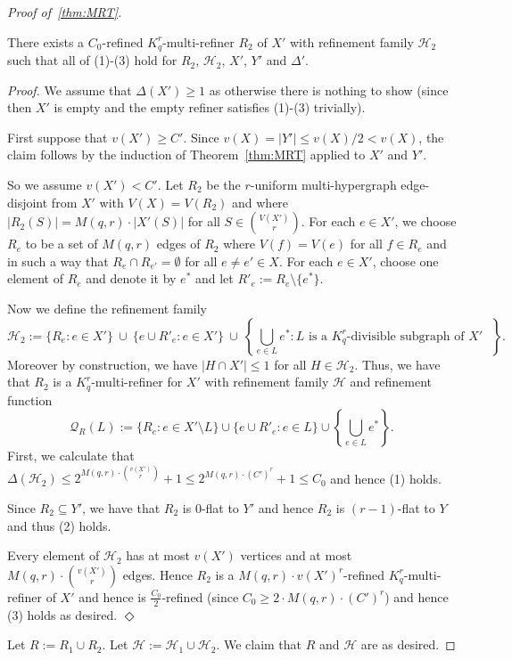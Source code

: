 \documentclass[11pt]{article}
\newcounter{i}
\theoremstyle{plain}
\newenvironment{proofclaim}[1][]%
{\noindent \emph{Proof.} {}{#1}{}}{\hfill
	$\Diamond$\vspace{1em}}
\renewcommand{\theclaim}{\thetheorem.\arabic{claim}}
\newenvironment{lateproof}[1]
 {%
  \renewcommand{\theclaim}{\ref{#1}.\arabic{claim}}%
  \begin{proof}[Proof of~\cref{#1}]%
 }
 {\end{proof}}
\theoremstyle{plain} %
\theoremstyle{definition}
\begin{document}
\begin{lateproof}{thm:MRT}
\begin{claim}
There exists a $C_0$-refined $K_q^r$-multi-refiner $R_2$ of $X'$ with refinement family $\mathcal{H}_2$ such that all of (1)-(3) hold for $R_2$, $\mathcal{H}_2$, $X'$, $Y'$ and $\Delta'$.
\end{claim}
\begin{proofclaim}
We assume that $\Delta(X') \ge 1$ as otherwise there is nothing to show (since then $X'$ is empty and the empty refiner satisfies (1)-(3) trivially). 

First suppose that $v(X')\ge C'$. Since $v(X)=|Y'| \le v(X)/2 < v(X)$, the claim follows by the induction of Theorem~\ref{thm:MRT} applied to $X'$ and $Y'$.

So we assume $v(X') < C'$. Let $R_2$ be the $r$-uniform multi-hypergraph edge-disjoint from $X'$ with $V(X)=V(R_2)$ and where $|R_2(S)|= M(q,r)\cdot |X'(S)|$ for all $S\in \binom{V(X')}{r}$. For each $e\in X'$, we choose $R_e$ to be a set of $M(q,r)$ edges of $R_2$ where $V(f)=V(e)$ for all $f\in R_e$ and in such a way that $R_e\cap R_{e'}=\emptyset$ for all $e\ne e'\in X$. For each $e\in X'$, choose one element of $R_e$ and denote it by $e^*$ and let $R'_e := R_e\setminus \{e^*\}$.

Now we define the refinement family 
$$\mathcal{H}_2 := \{R_e:e\in X'\}~\cup~\{e\cup R'_e: e\in X'\}~\cup~\left\{ \bigcup_{e\in L} e^*: L \text{ is a $K_q^r$-divisible subgraph of $X'$ }\right\}.$$
Moreover by construction, we have $|H\cap X'|\le 1$ for all $H\in \mathcal{H}_2$. Thus, we have that $R_2$ is a $K_q^r$-multi-refiner for $X'$ with refinement family $\mathcal{H}$ and refinement function
$$\mathcal{Q}_R(L) := \{R_e: e\in X'\setminus L\} \cup \{e\cup R'_e: e\in L\} \cup \left\{\bigcup_{e\in L} e^*\right\}.$$
First, we calculate that $\Delta(\mathcal{H}_2)\le 2^{M(q,r)\cdot \binom{v(X')}{r}} + 1 \le 2^{M(q,r)\cdot (C')^{r}} + 1 \le C_0$ and hence (1) holds.

Since $R_2\subseteq Y'$, we have that  $R_2$ is $0$-flat to $Y'$ and hence $R_2$ is $(r-1)$-flat to $Y$ and thus (2) holds.

Every element of $\mathcal{H}_2$ has at most $v(X')$ vertices and at most $M(q,r)\cdot \binom{v(X')}{r}$ edges. Hence $R_2$ is a $M(q,r)\cdot v(X')^r$-refined $K_q^r$-multi-refiner of $X'$ and hence is $\frac{C_0}{2}$-refined (since $C_0\ge 2\cdot M(q,r)\cdot (C')^{r}$) and hence (3) holds as desired.  
\end{proofclaim}

Let $R:=R_1\cup R_2$. Let $\mathcal{H}:= \mathcal{H}_1 \cup \mathcal{H}_{2}$. We claim that $R$ and $\mathcal{H}$ are as desired.


\end{lateproof}
\end{document}
